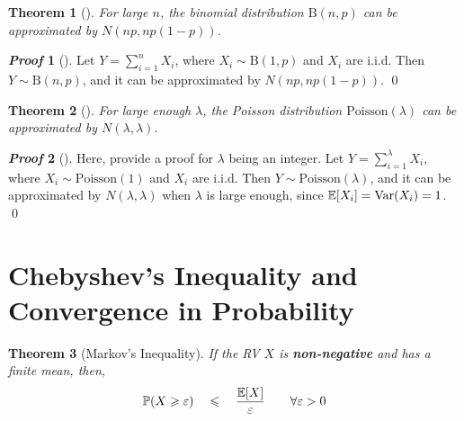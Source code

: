 \documentclass[10pt,UTF8]{article}
\newenvironment{definition box}
{\begin{tcolorbox}[colback=blue!5!white,colframe=blue!75!black,parbox=false,before upper=\par,before lower=\par]}
{\end{tcolorbox}}
\newenvironment{theorem box}
{\begin{tcolorbox}[colback=yellow!5!white,colframe=yellow!75!black,parbox=false,before upper=\par,before lower=\par]}
{\end{tcolorbox}}
\theoremstyle{definition}
\newtheorem{definition inner}{Definition}[section]
\theoremstyle{plain}
\newtheorem{theorem inner}{Theorem}[section]
\newenvironment{theorem}[1][]
{\begin{theorem box}\begin{theorem inner}[#1]\hfill\par}
{\end{theorem inner}\end{theorem box}}
\theoremstyle{definition}
\newtheorem*{proof inner}{\textit{Proof}}
\renewenvironment{proof}[1][]
{\begin{proof inner}[#1]\hfill\par}
{\qed\end{proof inner}}
\theoremstyle{remark}
\newcommand{\E}[1]{\mathbb{E}\qty[#1]}  %
\newcommand{\Prob}{\mathbb{P}\qty}
\newcommand{\Var}{\mathrm{Var}\qty}  %
\begin{document}
\begin{theorem}
    For large $n$, the binomial distribution $\mathrm{B}(n,p)$
    can be approximated by $N(n p,n p(1-p))$.
\end{theorem}
\begin{proof}
    Let $Y=\sum_{i=1}^n X_i$, where $X_i\sim \mathrm{B}(1,p)$ and $X_i$ are i.i.d.
    Then $Y\sim \mathrm{B}(n,p)$, and it can be approximated by
    $N(n p,n p(1-p))$.
\end{proof}

\begin{theorem}
    For large enough $\lambda$,
    the Poisson distribution $\mathrm{Poisson}(\lambda)$
    can be approximated by $N(\lambda,\lambda)$.
\end{theorem}
\begin{proof}
    Here, provide a proof for $\lambda$ being an integer.
    Let $Y=\sum_{i=1}^\lambda X_i$, where $X_i\sim \mathrm{Poisson}(1)$
    and $X_i$ are i.i.d.
    Then $Y\sim \mathrm{Poisson}(\lambda)$,
    and it can be approximated by
    $N(\lambda,\lambda)$ when $\lambda$ is large enough,
    since $\E{X_i}=\Var(X_i)=1$.
\end{proof}


\section{Chebyshev's Inequality and Convergence in Probability}

\begin{theorem}[Markov's Inequality]
    If the RV $X$ is \textbf{non-negative} and has a finite mean,
    then,
    \begin{equation*}
        \Prob(X \geqslant \varepsilon) \quad\leqslant\quad
        \frac{\E{X}}{\varepsilon}
        \qquad \forall \varepsilon > 0
    \end{equation*}
\end{theorem}
\end{document}
